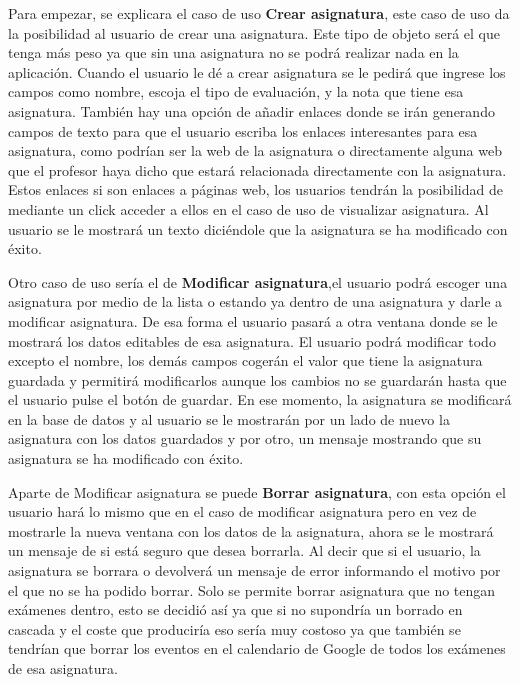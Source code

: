 Para empezar, se explicara el caso de uso \textbf{Crear asignatura}, este caso de uso da la posibilidad al usuario de crear una asignatura. Este tipo de objeto será el que tenga más peso ya que sin una asignatura no se podrá realizar nada en la aplicación.
Cuando el usuario le dé a crear asignatura se le pedirá que ingrese los campos como nombre, escoja el tipo de evaluación, y la nota que tiene esa asignatura.
También hay una opción de añadir enlaces donde se irán generando campos de texto para que el usuario escriba los enlaces interesantes para esa asignatura, como podrían ser la web de la asignatura o directamente alguna web que el profesor haya dicho que estará relacionada directamente con la asignatura. Estos enlaces si son enlaces a páginas web, los usuarios tendrán la posibilidad de mediante un click acceder a ellos en el caso de uso de visualizar asignatura.
Al usuario se le mostrará un texto diciéndole que la asignatura se ha modificado con éxito.

Otro caso de uso sería el de \textbf{Modificar asignatura},el usuario podrá escoger una asignatura por medio de la lista o estando ya dentro de una asignatura y darle a modificar asignatura. De esa forma el usuario pasará a otra ventana donde se le mostrará los datos editables de esa asignatura.
El usuario podrá modificar todo excepto el nombre, los demás campos cogerán el valor que tiene la asignatura guardada y permitirá modificarlos aunque los  cambios no se guardarán hasta que el usuario pulse el botón de guardar.
En ese momento, la asignatura se modificará en la base de datos y al usuario se le mostrarán por un lado de nuevo la asignatura con los datos guardados y por otro, un mensaje mostrando que su asignatura se ha modificado con éxito.


Aparte de Modificar asignatura se puede \textbf{Borrar asignatura}, con esta opción el usuario hará lo mismo que en el caso de modificar asignatura pero en vez de mostrarle la nueva ventana con los datos de la asignatura, ahora se le mostrará un mensaje de si está seguro que desea borrarla.
Al decir que si el usuario, la asignatura se borrara o devolverá un mensaje de error informando el motivo por el que no se ha podido borrar.
Solo se permite borrar asignatura que no tengan exámenes dentro, esto se decidió así ya que si no supondría un borrado en cascada y el coste que produciría eso sería muy costoso ya que también se tendrían que borrar los eventos en el calendario de Google de todos los exámenes de esa asignatura.



